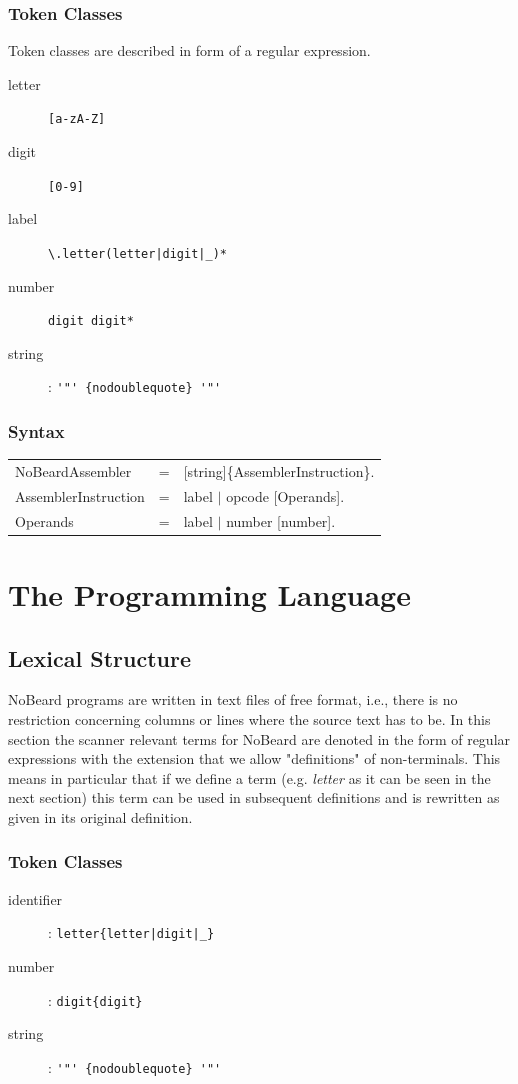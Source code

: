 \documentclass[11pt]{report}
\newcommand{\leongage}{NoBeard}
\newenvironment{grammar}[2] %
	{
		\newcommand{\completerule}[2]{##1 & = & ##2.\\}
		\newcommand{\startrule}[2]{##1 & = & ##2\\}
		\newcommand{\alternativerule}[1]{ & $|$ & ##1\\}
		\newcommand{\alternativeend}[1]{ & $|$ & ##1.\\}
		\newcommand{\finishrule}[1]{ & & ##1.\\}
		\begin{tabular}{p{#1} c p{#2}}
	}
	{	\end{tabular}
	}
\begin{document}
\subsection{Token Classes}
Token classes are described in form of a regular expression.
\begin{description}
	\item[letter] \lstinline$[a-zA-Z]$
	\item[digit] \lstinline$[0-9]$
	\item[label] \lstinline$\.letter(letter|digit|_)*$
	\item[number] \texttt{digit digit*}
	\item [string]: \verb$'"' {nodoublequote} '"'$
\end{description}

\subsection{Syntax}
\begin{grammar}{}{}
	\completerule{NoBeardAssembler}{[string]\{AssemblerInstruction\}}
	\completerule{AssemblerInstruction}{label $|$ opcode [Operands]}
	\completerule{Operands}{label $|$ number [number]}
\end{grammar}

\chapter{The Programming Language}
\section{Lexical Structure}

\leongage{} programs are written in text files of free format, i.e., there is no restriction concerning columns or lines where
the source text has to be. In this section the scanner relevant terms for \leongage{} are denoted in the form of regular expressions
with the extension that we allow "definitions" of non-terminals. This means in particular that if we define a term (e.g.
{\em letter} as it can be seen in the next section) this term can be used in subsequent definitions and is rewritten as
given in its original definition.

\subsection{Token Classes}
\begin{description}
	\item [identifier]: \verb$letter{letter|digit|_}$
	\item [number]: \verb$digit{digit}$
	\item [string]: \verb$'"' {nodoublequote} '"'$
\end{description}
\end{document}
